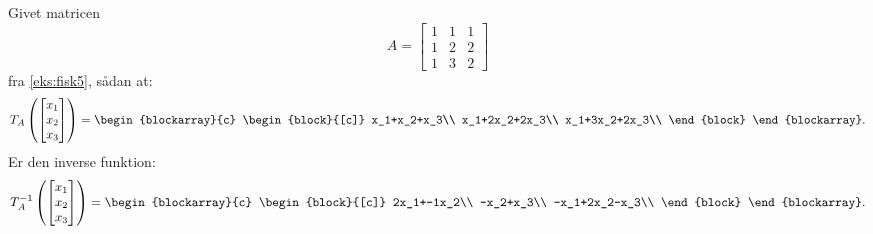 \begin{eks}
Givet matricen 
\begin{equation*}
A=
\begin{bmatrix}
1 & 1 & 1\\
1 & 2 & 2\\
1 & 3 & 2
\end{bmatrix}
\end{equation*}  
fra \ref{eks:fisk5}, sådan at:
\begin{equation*}
T_A
\left(
\begin{bmatrix}
x_1\\
x_2\\
x_3
\end{bmatrix}
\right)
=
\begin{blockarray}{c}
\begin{block}{[c]}
x_1+x_2+x_3\\
x_1+2x_2+2x_3\\
x_1+3x_2+2x_3\\
\end{block}
\end{blockarray}.
\end{equation*}
Er den inverse funktion:
\begin{equation*}
T_{A}^{-1}\left(
\begin{bmatrix}
x_1\\
x_2\\
x_3
\end{bmatrix}
\right)=
\begin{blockarray}{c}
\begin{block}{[c]}
2x_1+-1x_2\\
-x_2+x_3\\
-x_1+2x_2-x_3\\
\end{block}
\end{blockarray}.
\end{equation*}
\end{eks}